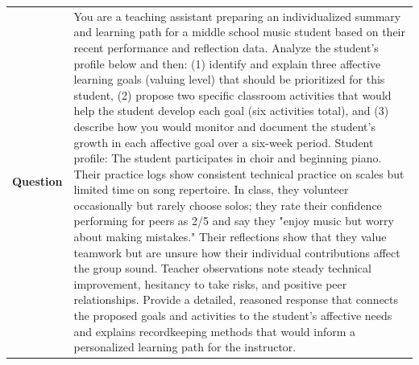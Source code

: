 \begin{longtable}{@{}l p{13cm}@{}}
  \textbf{Question}  & You are a teaching assistant preparing an individualized summary and learning path for a middle school music student based on their recent performance and reflection data. Analyze the student's profile below and then: (1) identify and explain three affective learning goals (valuing level) that should be prioritized for this student, (2) propose two specific classroom activities that would help the student develop each goal (six activities total), and (3) describe how you would monitor and document the student's growth in each affective goal over a six-week period. \newline Student profile: The student participates in choir and beginning piano. Their practice logs show consistent technical practice on scales but limited time on song repertoire. In class, they volunteer occasionally but rarely choose solos; they rate their confidence performing for peers as 2/5 and say they "enjoy music but worry about making mistakes." Their reflections show that they value teamwork but are unsure how their individual contributions affect the group sound. Teacher observations note steady technical improvement, hesitancy to take risks, and positive peer relationships. \newline Provide a detailed, reasoned response that connects the proposed goals and activities to the student's affective needs and explains recordkeeping methods that would inform a personalized learning path for the instructor.   \\

\end{longtable}
